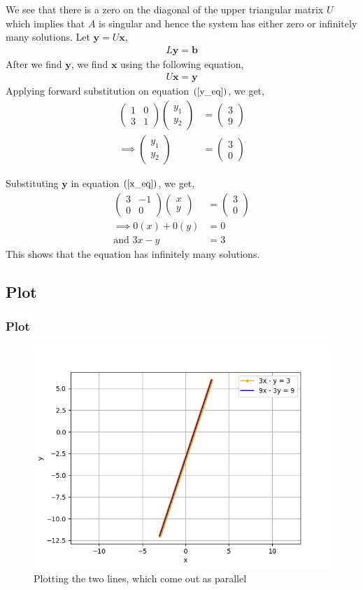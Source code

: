 \documentclass{beamer}
\providecommand{\brak}[1]{\ensuremath{\left(#1\right)}}
\theoremstyle{remark}
\newcommand{\myvec}[1]{\ensuremath{\begin{pmatrix}#1\end{pmatrix}}}
\let\vec\mathbf
\numberwithin{equation}{section}
\begin{document}
\begin{frame}
We see that there is a zero on the diagonal of the upper triangular matrix $U$ which implies that $A$ is singular and hence the system has either zero or infinitely many solutions.
\newline
Let $\vec{y} = U\vec{x}$,
\begin{align}
    L\vec{y} = \vec{b} \label{y_eq}
\end{align}
After we find $\vec{y}$, we find $\vec{x}$ using the following equation,
\begin{align}
    U\vec{x} = \vec{y} \label{x_eq}
\end{align}
Applying forward substitution on equation $\brak{\ref{y_eq}}$, we get,
\begin{align}
    \myvec{1 & 0\\3 & 1}\myvec{y_1\\y_2} &= \myvec{3\\9}\\
    \implies \myvec{y_1\\y_2} &= \myvec{3\\0}
\end{align}
\end{frame}

\begin{frame}
Substituting $\vec{y}$ in equation $\brak{\ref{x_eq}}$, we get,
\begin{align}
    \myvec{3 & -1\\0 & 0} \myvec{x\\y} &= \myvec{3\\0}\\
    \implies 0\brak{x} + 0\brak{y} &= 0\\
    \text{and } 3x - y &= 3
\end{align}
This shows that the equation has infinitely many solutions.
\end{frame}

\subsection{Plot}
\begin{frame}
\frametitle{Plot}
\begin{figure}[h!]
   \centering
   \includegraphics[width=0.7\linewidth]{figs/graph.png}
   \caption{Plotting the two lines, which come out as parallel}
\end{figure}
\end{frame}
\end{document}
